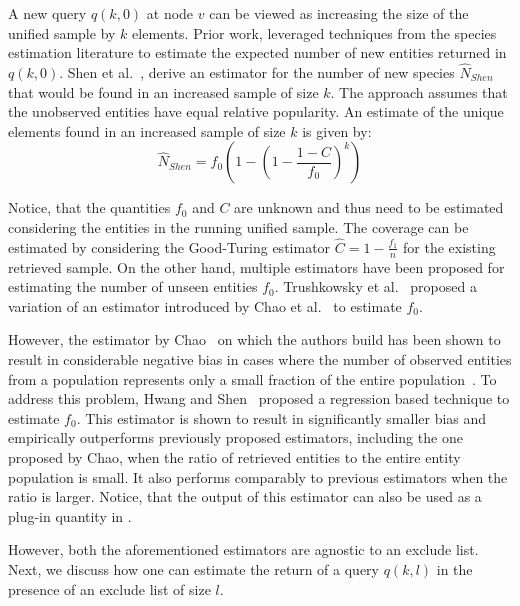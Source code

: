 \documentclass{vldb}
\begin{document}
A new query $q(k,0)$ at node $v$ can be viewed as increasing the size of the unified sample by $k$ elements. Prior work, leveraged techniques from the species estimation literature to estimate the expected number of new entities returned in $q(k,0)$. Shen et al.~\cite{shen:2003}, derive an estimator for the number of new species $\hat{N}_{Shen}$ that would be found in an increased sample of size $k$. The approach assumes that the unobserved entities have equal relative popularity. An estimate of the unique elements found in an increased sample of size $k$ is given by:
\begin{equation}
\label{eq:shen}
\hat{N}_{Shen} = f_0 \left( 1 - \left(1 - \frac{1 - C}{f_0}\right)^k\right)
\end{equation}

Notice, that the quantities $f_0$ and $C$ are unknown and thus need to be estimated considering the entities in the running unified sample. The coverage can be estimated by considering the Good-Turing estimator $\hat{C} = 1 - \frac{f_1}{n}$ for the existing retrieved sample. On the other hand, multiple estimators have been proposed for estimating the number of unseen entities $f_0$. Trushkowsky et al.~\cite{trushkowsky:2013} proposed a variation of an estimator introduced by Chao et al.~\cite{chao:1992} to estimate $f_0$. 

However, the estimator by Chao~\cite{chao:1992} on which the authors build has been shown to result in considerable negative bias in cases where the number of observed entities from a population represents only a small fraction of the entire population~\cite{hwang:2010}. To address this problem, Hwang and Shen~\cite{hwang:2010} proposed a regression based technique to estimate $f_0$. This estimator is shown to result in significantly smaller bias and empirically outperforms previously proposed estimators, including the one proposed by Chao, when the ratio of retrieved entities to the entire entity population is small. It also performs comparably to previous estimators when the ratio is larger. Notice, that the output of this estimator can also be used as a plug-in quantity in . 

However, both the aforementioned estimators are agnostic to an exclude list. Next, we discuss how one can estimate the return of a query $q(k,l)$ in the presence of an exclude list of size $l$.
\end{document}
